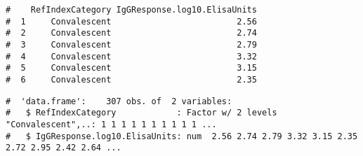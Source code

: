 \documentclass[letterpaper,12pt,twoside,]{pinp}
\begin{document}
\begin{Shaded}
\begin{Highlighting}[]
\StringTok{ }
\end{Highlighting}
\end{Shaded}

\begin{ShadedResult}
\begin{verbatim}
#    RefIndexCategory IgGResponse.log10.ElisaUnits
#  1     Convalescent                         2.56
#  2     Convalescent                         2.74
#  3     Convalescent                         2.79
#  4     Convalescent                         3.32
#  5     Convalescent                         3.15
#  6     Convalescent                         2.35
\end{verbatim}
\end{ShadedResult}

\begin{Shaded}
\begin{Highlighting}[]
\end{Highlighting}
\end{Shaded}

\begin{ShadedResult}
\begin{verbatim}
#  'data.frame':    307 obs. of  2 variables:
#   $ RefIndexCategory            : Factor w/ 2 levels "Convalescent",..: 1 1 1 1 1 1 1 1 1 1 ...
#   $ IgGResponse.log10.ElisaUnits: num  2.56 2.74 2.79 3.32 3.15 2.35 2.72 2.95 2.42 2.64 ...
\end{verbatim}
\end{ShadedResult}
\end{document}
